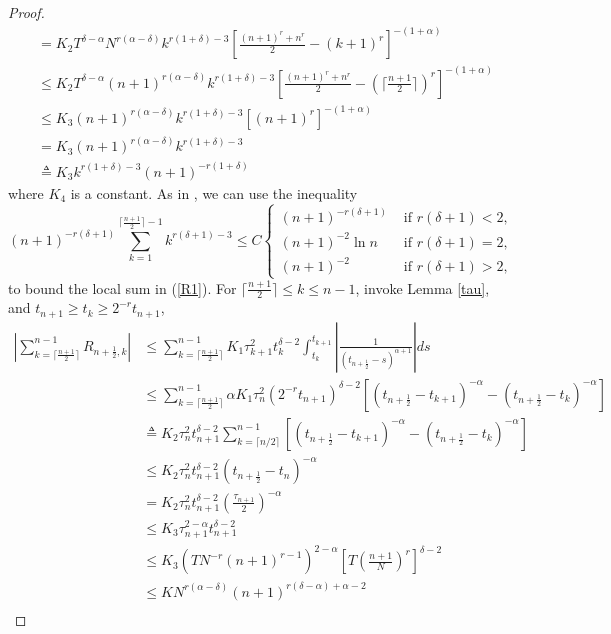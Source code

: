 \documentclass[10pt, reqno]{amsart}
\theoremstyle{remark}
\theoremstyle{definition}
\numberwithin{table}{section}
\begin{document}
\begin{proof}
\begin{align*}
    &=K_2T^{\delta-\alpha}N^{r(\alpha-\delta)}k^{r(1+\delta)-3}[\frac{(n+1)^r+n^r}{2}-(k+1)^r]^{-(1+\alpha)}\\
    &\leq K_2T^{\delta-\alpha}(n+1)^{r(\alpha-\delta)}k^{r(1+\delta)-3}[\frac{(n+1)^r+n^r}{2}-(\lceil \frac{n+1}{2}\rceil)^r]^{-(1+\alpha)}\\
    &\leq K_3(n+1)^{r(\alpha-\delta)}k^{r(1+\delta)-3}[(n+1)^r]^{-(1+\alpha)}\\
    &=K_3(n+1)^{r(\alpha-\delta)}k^{r(1+\delta)-3}\\
    &\triangleq{}K_3k^{r(1+\delta)-3}(n+1)^{-r(1+\delta)}
    \end{align*}
where $K_4$ is a constant. As in \cite{gracia2018}, we can use the inequality
\begin{equation}
    (n+1)^{-r(\delta+1)}\sum_{k=1}^{\lceil \frac{n+1}{2}\rceil-1}k^{r(\delta+1)-3}\leq C\begin{cases}(n+1)^{-r(\delta+1)}&\text{ if }r(\delta+1)<2, \\(n+1)^{-2}\ln n&\text{ if }r(\delta+1)=2, \\(n+1)^{-2}&\text{ if }r(\delta+1)>2, \end{cases}
\end{equation}
to bound the local sum in (\ref{R1}). 
For $\lceil \frac{n+1}{2}\rceil\leq k \leq n-1$, invoke Lemma \ref{tau}, and $t_{n+1}\geq t_k\geq2^{-r}t_{n+1}$, 
\begin{align*}
\left|\sum_{k=\lceil \frac{n+1}{2}\rceil}^{n-1}R_{{n+\frac{1}{2}}, k}\right|& \leq \sum_{k=\lceil \frac{n+1}{2}\rceil}^{n-1}K_1\tau_{k+1}^2t_k^{\delta-2}\int_{t_k}^{t_{k+1}}|\frac{1}{(t_{n+\frac{1}{2}}-s)^{\alpha+1}}|ds\\
    &\leq \sum_{k=\lceil \frac{n+1}{2}\rceil}^{n-1}\alpha K_1\tau_{n}^2(2^{-r}t_{n+1})^{\delta-2}[(t_{n+\frac{1}{2}}-t_{k+1})^{-\alpha}-(t_{n+\frac{1}{2}}-t_k)^{-\alpha}]\\
    &\triangleq{} K_2\tau_{n}^2t_{n+1}^{\delta-2}\sum_{k=\lceil n/2\rceil}^{n-1}[(t_{n+\frac{1}{2}}-t_{k+1})^{-\alpha}-(t_{n+\frac{1}{2}}-t_k)^{-\alpha}]\\
    &\leq K_2\tau_{n}^2t_{n+1}^{\delta-2}(t_{n+\frac{1}{2}}-t_{n})^{-\alpha}\\
    &= K_2 \tau_{n}^{2}t_{n+1}^{\delta-2}(\frac{\tau_{n+1}}{2})^{-\alpha}\\
    &\leq K_3 \tau_{n+1}^{2-\alpha}t_{n+1}^{\delta-2}\\
    &\leq  K_3(TN^{-r}(n+1)^{r-1})^{2-\alpha}[T(\frac{n+1}{N})^r]^{\delta-2}\\
    &\leq KN^{r(\alpha-\delta)}(n+1)^{r(\delta-\alpha)+\alpha-2}\\

\end{align*}
\end{proof}
\end{document}
